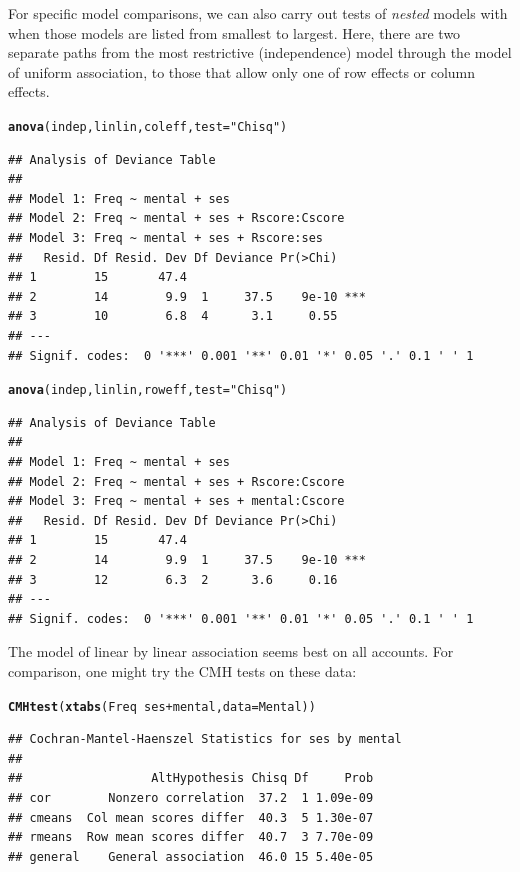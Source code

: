\documentclass[10pt,twoside]{article}\usepackage[]{graphicx}\usepackage[]{color}
\makeatletter
\newcommand{\hlstr}[1]{\textcolor[rgb]{0.192,0.494,0.8}{#1}}%
\newcommand{\hlopt}[1]{\textcolor[rgb]{0,0,0}{#1}}%
\newcommand{\hlstd}[1]{\textcolor[rgb]{0.345,0.345,0.345}{#1}}%
\newcommand{\hlkwc}[1]{\textcolor[rgb]{0.333,0.667,0.333}{#1}}%
\newcommand{\hlkwd}[1]{\textcolor[rgb]{0.737,0.353,0.396}{\textbf{#1}}}%
\newenvironment{kframe}{%
 \def\at@end@of@kframe{}%
 \ifinner\ifhmode%
  \def\at@end@of@kframe{\end{minipage}}%
  \begin{minipage}{\columnwidth}%
 \fi\fi%
 \def\FrameCommand##1{\hskip\@totalleftmargin \hskip-\fboxsep
 \colorbox{shadecolor}{##1}\hskip-\fboxsep
     \hskip-\linewidth \hskip-\@totalleftmargin \hskip\columnwidth}%
 \MakeFramed {\advance\hsize-\width
   \@totalleftmargin\z@ \linewidth\hsize
   \@setminipage}}%
 {\par\unskip\endMakeFramed%
 \at@end@of@kframe}
\newenvironment{knitrout}{}{} %
\newcommand{\codefun}[1]{\code{#1()}}
\makeatother
\begin{document}
For specific model comparisons, we can also carry out tests of \emph{nested} models with
\codefun{anova} when those models are listed from smallest to largest.
Here, there are two separate paths from the most restrictive (independence) model
through the model of uniform association, to those that allow only one of
row effects or column effects.
\begin{knitrout}
\color{fgcolor}\begin{kframe}
\begin{alltt}
\hlkwd{anova}\hlstd{(indep, linlin, coleff,} \hlkwc{test}\hlstd{=}\hlstr{"Chisq"}\hlstd{)}
\end{alltt}
\begin{verbatim}
## Analysis of Deviance Table
## 
## Model 1: Freq ~ mental + ses
## Model 2: Freq ~ mental + ses + Rscore:Cscore
## Model 3: Freq ~ mental + ses + Rscore:ses
##   Resid. Df Resid. Dev Df Deviance Pr(>Chi)    
## 1        15       47.4                         
## 2        14        9.9  1     37.5    9e-10 ***
## 3        10        6.8  4      3.1     0.55    
## ---
## Signif. codes:  0 '***' 0.001 '**' 0.01 '*' 0.05 '.' 0.1 ' ' 1
\end{verbatim}
\begin{alltt}
\hlkwd{anova}\hlstd{(indep, linlin, roweff,} \hlkwc{test}\hlstd{=}\hlstr{"Chisq"}\hlstd{)}
\end{alltt}
\begin{verbatim}
## Analysis of Deviance Table
## 
## Model 1: Freq ~ mental + ses
## Model 2: Freq ~ mental + ses + Rscore:Cscore
## Model 3: Freq ~ mental + ses + mental:Cscore
##   Resid. Df Resid. Dev Df Deviance Pr(>Chi)    
## 1        15       47.4                         
## 2        14        9.9  1     37.5    9e-10 ***
## 3        12        6.3  2      3.6     0.16    
## ---
## Signif. codes:  0 '***' 0.001 '**' 0.01 '*' 0.05 '.' 0.1 ' ' 1
\end{verbatim}
\end{kframe}
\end{knitrout}

The model of linear by linear association seems best on all accounts.
For comparison, one might try the CMH tests on these data:

\begin{knitrout}
\color{fgcolor}\begin{kframe}
\begin{alltt}
\hlkwd{CMHtest}\hlstd{(}\hlkwd{xtabs}\hlstd{(Freq}\hlopt{~}\hlstd{ses}\hlopt{+}\hlstd{mental,} \hlkwc{data}\hlstd{=Mental))}
\end{alltt}
\begin{verbatim}
## Cochran-Mantel-Haenszel Statistics for ses by mental 
## 
##                  AltHypothesis Chisq Df     Prob
## cor        Nonzero correlation  37.2  1 1.09e-09
## cmeans  Col mean scores differ  40.3  5 1.30e-07
## rmeans  Row mean scores differ  40.7  3 7.70e-09
## general    General association  46.0 15 5.40e-05
\end{verbatim}
\end{kframe}
\end{knitrout}
\end{document}

